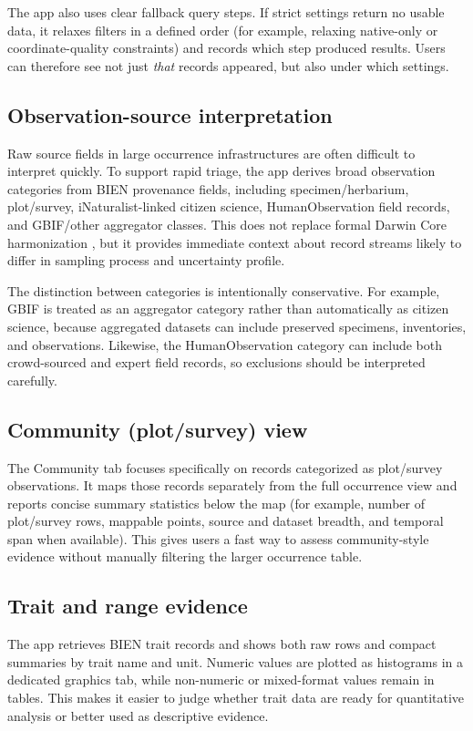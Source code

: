 \documentclass[11pt]{article}
\begin{document}
The app also uses clear fallback query steps. If strict settings return no usable data, it relaxes filters in a defined order (for example, relaxing native-only or coordinate-quality constraints) and records which step produced results. Users can therefore see not just \emph{that} records appeared, but also under which settings.

\subsection*{Observation-source interpretation}
Raw source fields in large occurrence infrastructures are often difficult to interpret quickly. To support rapid triage, the app derives broad observation categories from BIEN provenance fields, including specimen/herbarium, plot/survey, iNaturalist-linked citizen science, HumanObservation field records, and GBIF/other aggregator classes. This does not replace formal Darwin Core harmonization \citep{Wieczorek2012DarwinCore}, but it provides immediate context about record streams likely to differ in sampling process and uncertainty profile.

The distinction between categories is intentionally conservative. For example, GBIF is treated as an aggregator category rather than automatically as citizen science, because aggregated datasets can include preserved specimens, inventories, and observations. Likewise, the HumanObservation category can include both crowd-sourced and expert field records, so exclusions should be interpreted carefully.

\subsection*{Community (plot/survey) view}
The Community tab focuses specifically on records categorized as plot/survey observations. It maps those records separately from the full occurrence view and reports concise summary statistics below the map (for example, number of plot/survey rows, mappable points, source and dataset breadth, and temporal span when available). This gives users a fast way to assess community-style evidence without manually filtering the larger occurrence table.

\subsection*{Trait and range evidence}
The app retrieves BIEN trait records and shows both raw rows and compact summaries by trait name and unit. Numeric values are plotted as histograms in a dedicated graphics tab, while non-numeric or mixed-format values remain in tables. This makes it easier to judge whether trait data are ready for quantitative analysis or better used as descriptive evidence.
\end{document}
